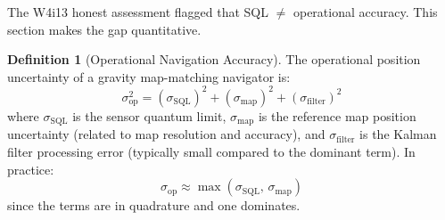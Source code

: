 \documentclass[11pt]{article}
\theoremstyle{definition}
\newtheorem{definition}[theorem]{Definition}
\theoremstyle{remark}
\newcommand{\SQL}{\mathrm{SQL}}
\begin{document}
The W4i13 honest assessment flagged that SQL $\neq$ operational accuracy.
This section makes the gap quantitative.

\begin{definition}[Operational Navigation Accuracy]
\label{def:op-accuracy}
The operational position uncertainty of a gravity map-matching navigator is:
\begin{equation}
\sigma_{\mathrm{op}}^2 = (\sigma_{\SQL})^2 + (\sigma_{\mathrm{map}})^2
+ (\sigma_{\mathrm{filter}})^2
\label{eq:op-accuracy}
\end{equation}
where $\sigma_{\SQL}$ is the sensor quantum limit, $\sigma_{\mathrm{map}}$ is
the reference map position uncertainty (related to map resolution and accuracy),
and $\sigma_{\mathrm{filter}}$ is the Kalman filter processing error (typically
small compared to the dominant term). In practice:
\begin{equation}
\sigma_{\mathrm{op}} \approx \max(\sigma_{\SQL},\,\sigma_{\mathrm{map}})
\label{eq:op-approx}
\end{equation}
since the terms are in quadrature and one dominates.
\end{definition}
\end{document}
